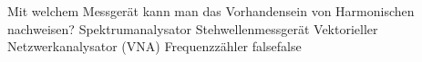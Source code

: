     {Mit welchem Messgerät kann man das Vorhandensein von Harmonischen nachweisen?}
    {Spektrumanalysator}
    {Stehwellenmessgerät}
    {Vektorieller Netzwerkanalysator (VNA)}
    {Frequenzzähler}
    {false}{false}